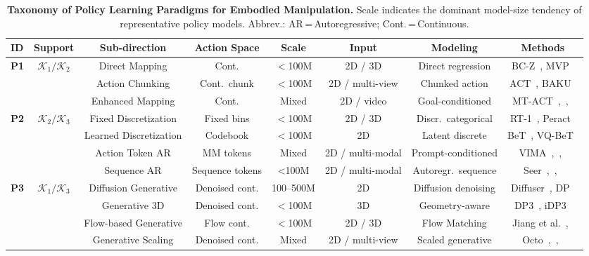 \documentclass[acmsmall,screen,review]{acmart}
\begin{document}
\begin{table}[t!]
\centering
\caption{\textbf{Taxonomy of Policy Learning Paradigms for Embodied Manipulation.} Scale indicates the dominant model-size tendency of representative policy models.
Abbrev.: AR\,=\,Autoregressive; Cont.\,=\,Continuous.}\label{tab:policy_paradigms}
\renewcommand{\arraystretch}{1.15}
\setlength{\tabcolsep}{2.5pt}
\scriptsize
\begin{tabular}{
  l
  c
  c
  c
  c
  c
  c
  c
}
\toprule
\textbf{ID} &
\textbf{Support} &
\textbf{Sub-direction} &
\textbf{Action Space} &
\textbf{Scale} &
\textbf{Input} &
\textbf{Modeling} &
\textbf{Methods} \\
\midrule
\multirow{3}{*}{\textbf{P1}}
 & \multirow{3}{*}{$\mathcal{K}_1/\mathcal{K}_2$} & Direct Mapping & Cont. & {$<$100M} & 2D / 3D & Direct regression & BC-Z~\cite{jang2022bc}, MVP~\cite{xiao2022mvp} \\
 & & Action Chunking & Cont.\ chunk & {$<$100M} & 2D / multi-view & Chunked action & ACT~\cite{zhao2023learning}, BAKU~\cite{haldar2024baku} \\
 & & Enhanced Mapping & Cont. & {Mixed} & 2D / video & Goal-conditioned & MT-ACT~\cite{bharadhwaj2024roboagent},~\cite{wang2023mimicplay},~\cite{ren2025motion_tracks} \\
\midrule
\multirow{4}{*}{\textbf{P2}}
 & \multirow{4}{*}{$\mathcal{K}_2/\mathcal{K}_3$} & Fixed Discretization & Fixed bins & {$<$100M} & 2D / 3D & Discr.\ categorical & RT-1~\cite{brohan2023rt1}, Peract~\cite{shridhar2022peract} \\
 & & Learned Discretization & Codebook & {$<$100M} & 2D & Latent discrete & BeT~\cite{shafiullah2022bet}, VQ-BeT~\cite{lee2024vqbet} \\
 & & Action Token AR & MM tokens & {Mixed} & 2D / multi-modal & Prompt-conditioned & VIMA~\cite{jiang2023vima},~\cite{wu2023gr1},~\cite{fu2025icil} \\
 & & Sequence AR & Sequence tokens & {<100M} & 2D / multi-modal & Autoregr.\ sequence & Seer~\cite{tian2024seer},~\cite{zhang2025arp},~\cite{gong2025carp} \\
\midrule
\multirow{4}{*}{\textbf{P3}}
 & \multirow{4}{*}{$\mathcal{K}_1/\mathcal{K}_3$} & Diffusion Generative & Denoised cont. & {100--500M} & 2D & Diffusion denoising & Diffuser~\cite{janner2022diffuser}, DP~\cite{chi2023diffusion} \\
 & & Generative 3D & Denoised cont. & {$<$100M} & 3D & Geometry-aware & DP3~\cite{ze2024diffusion}, iDP3~\cite{liang2024idp3} \\
 & & Flow-based Generative & Flow cont. & {$<$100M} & 2D / 3D & Flow Matching & Jiang et al.~\cite{jiang2025streaming},~\cite{zhang2025flowpolicy} \\
 & & Generative Scaling & Denoised cont. & {Mixed} & 2D / multi-view & Scaled generative & Octo~\cite{octomodelteam2024},~\cite{liu2025rdtb},~\cite{reuss2025flower} \\
\bottomrule
\end{tabular}
\end{table}
\end{document}
